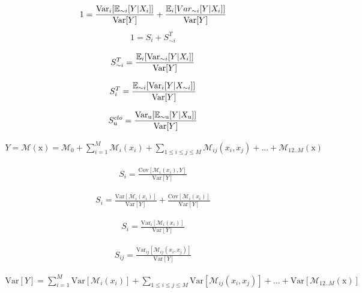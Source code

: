 \begin{align}
1 = \frac{\text{Var}_i[\operatorname*{\mathbb{E}}_{\sim i}[Y|X_i]]}{\text{Var}[Y]} + \frac{\operatorname*{\mathbb{E}}_{i}[Var_{\sim i}[Y|X_i]]}{\text{Var}[Y]}
\end{align}
\begin{align}
1 = S_i + S_{\sim i}^T
\end{align}

\begin{align}
S_{\sim i}^T = \frac{\operatorname*{\mathbb{E}}_{i}[\text{Var}_{\sim i}[Y|X_i]]}{\text{Var}[Y]}
\end{align}

\begin{align}
S_{i}^T = \frac{\operatorname*{\mathbb{E}}_{\sim i}[\text{Var}_{i}[Y|X_{\sim i}]]}{\text{Var}[Y]}
\end{align}

\begin{align}
S_\text{u}^{clo} = \frac{\text{Var}_\text{u}[\operatorname*{\mathbb{E}}_{\sim \text{u}}[Y|X_\text{u} ]]}{\text{Var}[Y]}
\end{align}


\begin{align}
Y = \mathcal{M}(\text{x}) = \mathcal{M}_0 + \sum_{i=1}^{M} \mathcal{M}_i(x_i) + \sum_{1 \leq i \leq j \leq M} \mathcal{M}_{ij}(x_i,x_j) + ... + \mathcal{M}_{12..M}(\text{x})
\end{align}

\begin{align}
S_i = \frac{\text{Cov}[\mathcal{M}_i(x_i), Y]}{\text{Var}[Y]}
\end{align}

\begin{align}
S_i = \frac{\text{Var}[\mathcal{M}_i(x_i)]}{\text{Var}[Y]} + \frac{\text{Cov}[\mathcal{M}_i(x_i)]}{\text{Var}[Y]}
\end{align}

\begin{align}
S_i = \frac{\text{Var}_i[\mathcal{M}_i(x_i)]}{\text{Var}[Y]}
\end{align}

\begin{align}
S_{ij} = \frac{\text{Var}_{ij}[\mathcal{M}_{ij}(x_i,x_j)]}{\text{Var}[Y]}
\end{align}

\begin{align}
\text{Var}[Y] =  \sum_{i=1}^{M} \text{Var}[\mathcal{M}_i(x_i)] + \sum_{1 \leq i \leq j \leq M} \text{Var}[\mathcal{M}_{ij}(x_i,x_j)] + ... + \text{Var}[\mathcal{M}_{12..M}(\text{x})]
\end{align}

